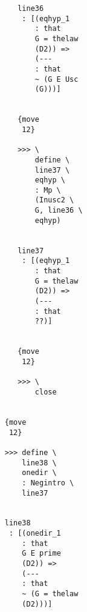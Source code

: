 \documentclass[12pt]{article}
\begin{document}
\begin{verbatim}
                                       line36 
                                        : [(eqhyp_1 
                                           : that 
                                           G = thelaw 
                                           (D2)) => 
                                           (--- 
                                           : that 
                                           ~ (G E Usc 
                                           (G)))]


                                       {move 
                                        12}

                                       >>> \
                                           define \
                                           line37 \
                                           eqhyp \
                                           : Mp \
                                           (Inusc2 \
                                           G, line36 \
                                           eqhyp)


                                       line37 
                                        : [(eqhyp_1 
                                           : that 
                                           G = thelaw 
                                           (D2)) => 
                                           (--- 
                                           : that 
                                           ??)]


                                       {move 
                                        12}

                                       >>> \
                                           close


                                    {move 
                                     12}

                                    >>> define \
                                        line38 \
                                        onedir \
                                        : Negintro \
                                        line37


                                    line38 
                                     : [(onedir_1 
                                        : that 
                                        G E prime 
                                        (D2)) => 
                                        (--- 
                                        : that 
                                        ~ (G = thelaw 
                                        (D2)))]



\end{verbatim}
\end{document}
